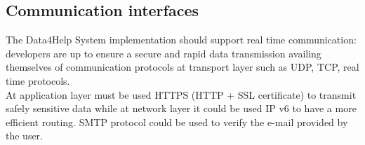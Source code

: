 \subsection{Communication interfaces}
The Data4Help System implementation should support real time communication: developers are up to ensure a secure and rapid data transmission availing themselves of communication protocols at transport layer such as UDP, TCP, real time protocols.  \\
At application layer must be used HTTPS (HTTP + SSL certificate) to transmit safely sensitive data while at network layer it could be used IP v6 to have a more efficient routing. 
SMTP protocol could be used to verify the e-mail provided by the user.




